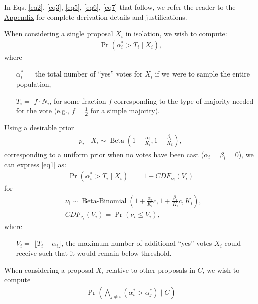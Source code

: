 \documentclass[chi_draft]{sigchi}
\begin{document}
In Eqs. \eqref{eq2}, \eqref{eq3}, \eqref{eq5}, \eqref{eq6}, \eqref{eq7} that follow, we refer the reader to the \hyperref[sec:derivation]{Appendix} for complete derivation details and justifications.

When considering a single proposal $X_i$ in isolation, we wish to compute:
\begin{align}\label{eq1}
\Pr(\alpha^*_i > T_i \mid X_i),
\end{align}
where
\begin{description}
\begin{itemize}
\item[$\alpha^*_i = $] the total number of ``yes'' votes for $X_i$ if we were to sample the entire population,
\item[$T_i = $] $f \cdot N_i$, for some fraction $f$ corresponding to the type of majority needed for the vote
(e.g., $f=\frac{1}{2}$ for a simple majority).
\end{itemize}
\end{description}
Using a desirable prior 
\begin{align}\label{eq2}
p_i \mid X_i \sim \operatorname{Beta}(1+\frac{\alpha_i}{K_i},1+\frac{\beta_i}{K_i}),
\end{align}
corresponding to a uniform prior when no votes have been cast ($\alpha_i = \beta_i = 0$), we can express \eqref{eq1} as:
\begin{align}\label{eq3}
\Pr(\alpha^*_i > T_i \mid X_i) &= 1 - {CDF}_{\nu_i}(V_i)
\end{align}
for
\begin{align*}
&\nu_i \sim \operatorname{Beta-Binomial}(1 + \frac{\alpha_i}{K_i}c, 1 + \frac{\beta_i}{K_i}c, K_i),\\
&{CDF}_{\nu_i}(V_i)  = \Pr(\nu_i \leq V_i),
\end{align*}
where
\begin{description}
\begin{itemize}
\item[$V_i = $] $\lfloor{T_i - \alpha_i}\rfloor$, the maximum number of additional ``yes'' votes $X_i$ could receive such that it would remain below threshold.
\end{itemize}
\end{description}

When considering a proposal $X_i$ relative to other proposals in $C$, we wish to compute
\begin{align}\label{eq4}
\Pr\left(\bigwedge_{j \neq i} (\alpha^*_i > \alpha^*_j) \mid C\right)
\end{align}
\end{document}
